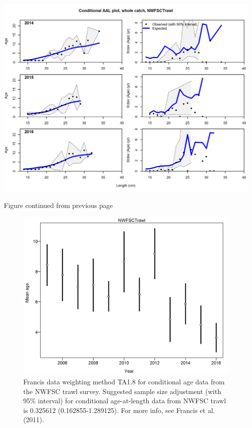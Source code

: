 \documentclass[12pt,]{article}
\begin{document}
\includegraphics{./r4ss/plots_mod1/comp_condAALfit_Andre_plotsflt8mkt0_page4.png}

\begin{center} 

              Figure continued from previous page 

             \end{center}

\begin{figure}[htbp]
\centering
\includegraphics{r4ss/plots_mod1/comp_condAALdat_data_weighting_TA1.8_condAgeNWFSCTrawl.png}
\caption{Francis data weighting method TA1.8 for conditional age data
from the NWFSC trawl survey. Suggested sample size adjustment (with 95\%
interval) for conditional age-at-length data from NWFSC trawl is
0.325612 (0.162855-1.289125). For more info, see Francis et al. (2011).
\label{fig:comp_condAALdat_data_weighting_TA1.8_condAgeNWFSCTrawl}}
\end{figure}
\end{document}
